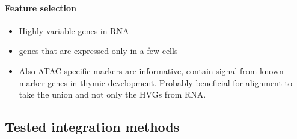 \documentclass[]{article}
\providecommand{\tightlist}{%
  \setlength{\itemsep}{0pt}\setlength{\parskip}{0pt}}
\let\oldparagraph\paragraph
\renewcommand{\paragraph}[1]{\oldparagraph{#1}\mbox{}}
\begin{document}
\hypertarget{feature-selection}{%
\paragraph{Feature selection}\label{feature-selection}}

\begin{itemize}
\tightlist
\item
  Highly-variable genes in RNA
\item
  genes that are expressed only in a few cells
\item
  Also ATAC specific markers are informative, contain signal from known
  marker genes in thymic development. Probably beneficial for alignment
  to take the union and not only the HVGs from RNA.
\end{itemize}

\hypertarget{tested-integration-methods}{%
\subsection{Tested integration
methods}\label{tested-integration-methods}}
\end{document}
